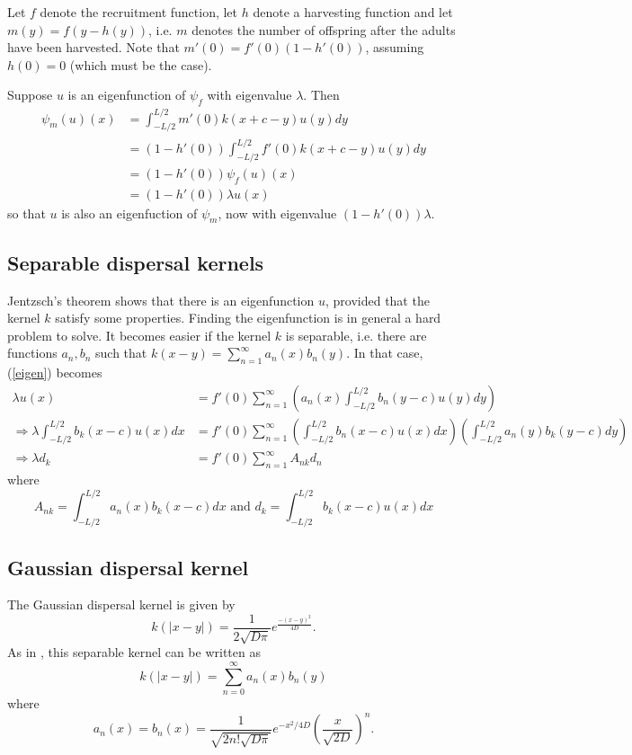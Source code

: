 \documentclass[]{article}
\begin{document}
Let $f$ denote the recruitment function, let $h$ denote a harvesting function and let $m(y)=f(y-h(y))$, i.e. $m$ denotes the number of offspring after the adults have been harvested.  Note that $m'(0)=f'(0)(1-h'(0))$, assuming $h(0)=0$ (which must be the case).

Suppose $u$ is an eigenfunction of $\psi_f$ with eigenvalue $\lambda$.  Then 
\begin{align*}
\psi_m(u)(x)&=\int_{-L/2}^{L/2}m'(0)k(x+c-y)u(y)dy
\\&=(1-h'(0))\int_{-L/2}^{L/2}f'(0)k(x+c-y)u(y)dy
\\&=(1-h'(0))\psi_f(u)(x)
\\&=(1-h'(0))\lambda u(x)
\end{align*}
so that $u$ is also an eigenfuction of $\psi_m$, now with eigenvalue $(1-h'(0))\lambda$.

\subsection{Separable dispersal kernels }
Jentzsch's theorem shows that there is an eigenfunction $u$, provided that the kernel $k$ satisfy some properties.  Finding the eigenfunction is in general a hard problem to solve.  It becomes easier if the kernel $k$ is separable, i.e. there are functions $a_n,b_n$ such that $k(x-y)=\sum_{n=1}^\infty a_n(x)b_n(y)$.  In that case, (\ref{eigen}) becomes
\begin{align*}
\lambda u(x)&=f'(0)\sum_{n=1}^\infty\left( a_n(x)\int_{-L/2}^{L/2}b_n(y-c)u(y)dy\right)
\\ \Rightarrow \lambda\int_{-L/2}^{L/2}b_k(x-c)u(x)dx&=f'(0)\sum_{n=1}^{\infty}\left(\int_{-L/2}^{L/2}b_n(x-c)u(x)dx\right)\left(\int_{-L/2}^{L/2}a_n(y)b_k(y-c)dy\right)
\\ \Rightarrow \lambda d_k&=f'(0)\sum_{n=1}^\infty A_{nk}d_n  \tag{**} \label{problem}
\end{align*}
where
\begin{equation*}
A_{nk}=\int_{-L/2}^{L/2}a_n(x)b_k(x-c)dx \text{ and } d_k=\int_{-L/2}^{L/2}b_k(x-c)u(x)dx
\end{equation*}

\subsection{Gaussian dispersal kernel }
The Gaussian dispersal kernel is given by
$$k(|x-y|)=\frac{1}{2\sqrt{D\pi}}e^{\frac{-(x-y)^2}{4D}}.$$
As in \citep{Latore:1998fk}, this separable kernel can be written as
$$k(|x-y|)=\sum_{n=0}^\infty a_n(x)b_n(y)$$
where
$$a_n(x)=b_n(x)=\frac{1}{\sqrt{2n!\sqrt{D\pi}}}e^{-x^2/4D}\left(\frac{x}{\sqrt{2D}}\right)^n.$$
\end{document}
